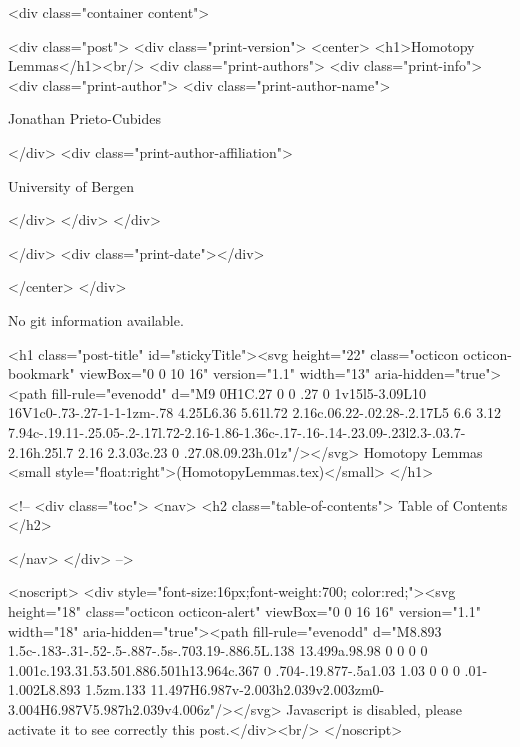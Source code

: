       <div class="container content">
        







<div class="post">
  <div class="print-version">
    <center>
      <h1>Homotopy Lemmas</h1><br/>
        <div class="print-authors">
          <div class="print-info">
            <div class="print-author">
              <div class="print-author-name">
                
                  Jonathan Prieto-Cubides
                
              </div>
              <div class="print-author-affiliation">
                
                  University of Bergen
                
                </div>
            </div>
          </div>
          
          
        </div>
        <div class="print-date"></div>
        
        
    </center>
  </div>

  
  No git information available.
  

  <h1 class="post-title" id="stickyTitle"><svg height="22" class="octicon octicon-bookmark" viewBox="0 0 10 16" version="1.1" width="13" aria-hidden="true"><path fill-rule="evenodd" d="M9 0H1C.27 0 0 .27 0 1v15l5-3.09L10 16V1c0-.73-.27-1-1-1zm-.78 4.25L6.36 5.61l.72 2.16c.06.22-.02.28-.2.17L5 6.6 3.12 7.94c-.19.11-.25.05-.2-.17l.72-2.16-1.86-1.36c-.17-.16-.14-.23.09-.23l2.3-.03.7-2.16h.25l.7 2.16 2.3.03c.23 0 .27.08.09.23h.01z"/></svg> Homotopy Lemmas <small style="float:right">(HomotopyLemmas.tex)</small>
  </h1>

  <!-- 
  <div class="toc">
    <nav>
    <h2 class="table-of-contents"> Table of Contents </h2>
      

    </nav>
  </div>
   -->

  <noscript>
  <div style="font-size:16px;font-weight:700; color:red;"><svg height="18" class="octicon octicon-alert" viewBox="0 0 16 16" version="1.1" width="18" aria-hidden="true"><path fill-rule="evenodd" d="M8.893 1.5c-.183-.31-.52-.5-.887-.5s-.703.19-.886.5L.138 13.499a.98.98 0 0 0 0 1.001c.193.31.53.501.886.501h13.964c.367 0 .704-.19.877-.5a1.03 1.03 0 0 0 .01-1.002L8.893 1.5zm.133 11.497H6.987v-2.003h2.039v2.003zm0-3.004H6.987V5.987h2.039v4.006z"/></svg> Javascript is disabled, please activate it to see correctly this post.</div><br/>
  </noscript>

